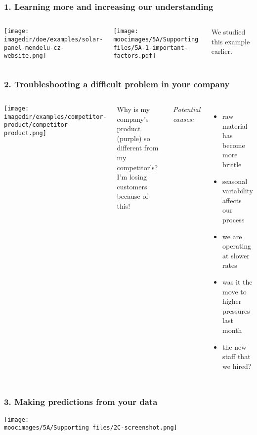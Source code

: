 \documentclass[handout,11pt,aspectratio=169,mathserif]{beamer}
\begin{document}
\begin{frame}\frametitle{1. Learning more and increasing our understanding}
	\begin{columns}[T]
			\texttt{[image: \\imagedir/doe/examples/solar-panel-mendelu-cz-website.png]}
			
			
			
			\texttt{[image: \\moocimages/5A/Supporting files/5A-1-important-factors.pdf]}
		
			\vspace{.5cm}
			\color{myOrange}\tiny We studied this example earlier.
			
	\end{columns}
\end{frame}

\begin{frame}\frametitle{2. Troubleshooting a difficult problem in your company}
	\begin{columns}[T]
			\texttt{[image: \\imagedir/examples/competitor-product/competitor-product.png]}
			
			
			Why is {\color{purple} my company's product (purple)} so different from my {\color{red} competitor's}? \\
			I'm losing customers because of this!
			
			\vspace{0.5cm}
			{\color{blue}\emph{Potential causes:}}
			\begin{itemize}
				\item	raw material has become more brittle
				\item	seasonal variability affects our process
				\item	we are operating at slower rates
				\item	was it the move to higher pressures last month
				\item	the new staff that we hired?
			\end{itemize}
			
	\end{columns}
\end{frame}

\begin{frame}\frametitle{3. Making predictions from your data}
	\texttt{[image: \\moocimages/5A/Supporting files/2C-screenshot.png]}
\end{frame}
\end{document}
